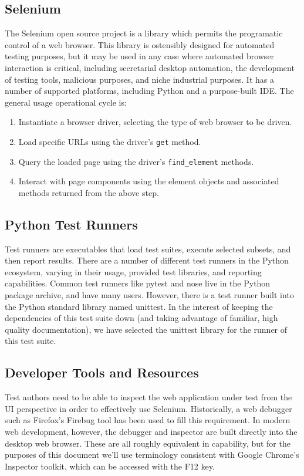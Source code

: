 \subsection{Selenium}
The Selenium open source project is a library which permits the programatic control of a web browser. This library is ostensibly designed for automated testing purposes, but it may be used in any case where automated browser interaction is critical, including secretarial desktop automation, the development of testing tools, malicious purposes, and niche industrial purposes. It has a number of supported platforms, including Python and a purpose-built IDE. The general usage operational cycle is:
\begin{enumerate}
\item Instantiate a browser driver, selecting the type of web browser to be driven.
\item Load specific URLs using the driver's \texttt{get} method.
\item Query the loaded page using the driver's \texttt{find\_element} methods.
\item Interact with page components using the element objects and associated methods returned from the above step.
\end{enumerate}\citep{holmes2006automating, bruns2009web, razak2011agile, wang2009build, kaur2013comparative, kongsli2007security, artzi2011framework}

\subsection{Python Test Runners}
Test runners are executables that load test suites, execute selected subsets, and then report results. There are a number of different test runners in the Python ecosystem, varying in their usage, provided test libraries, and reporting capabilities. Common test runners like pytest and nose live in the Python package archive, and have many users. However, there is a test runner built into the Python standard library named unittest. In the interest of keeping the dependencies of this test suite down (and taking advantage of familiar, high quality documentation), we have selected the unittest library for the runner of this test suite. \citep{nielsen2014python, pajankar2017python}

\subsection{Developer Tools and Resources}
Test authors need to be able to inspect the web application under test from the UI perspective in order to effectively use Selenium. Historically, a web debugger such as Firefox's Firebug tool has been used to fill this requirement. In modern web development, however, the debugger and inspector are built directly into the desktop web browser. These are all roughly equivalent in capability, but for the purposes of this document we'll use terminology consistent with Google Chrome's Inspector toolkit, which can be accessed with the F12 key.\citep{odell2014browser}

